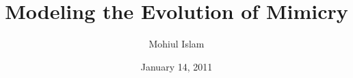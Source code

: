 \documentclass{beamer}
\title[Modeling the Evolution of Mimicry]{Modeling the Evolution of Mimicry}
\author{Mohiul Islam}
\institute{Concordia University}
\date{January 14, 2011}
\begin{document}
\frame{\titlepage}

\section[Outline]{}
\frame{\tableofcontents}








\end{document}
